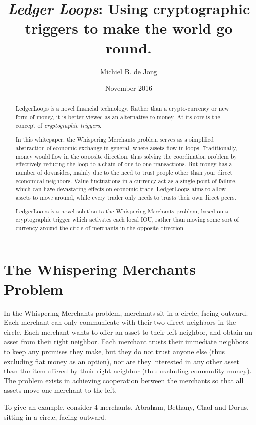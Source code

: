 \documentclass[11pt,twoside,a4paper]{article}
\begin{document}
\title{{\em Ledger Loops}: Using cryptographic triggers to make the world go round.}
\author{Michiel B. de Jong}
\date{November 2016}
\maketitle
\begin{abstract}
LedgerLoops is a novel financial technology. Ra\-ther than a cryp\-to-cur\-ren\-cy or new form of mo\-ney, it is better viewed as an alternative to money. At its core is the concept of {\em cryptographic triggers}.

In this whitepaper, the Whispering Merchants problem serves as a simplified abstraction of economic exchange in general, where assets flow in loops. Traditionally, money would flow in the opposite direction, thus solving the coordination problem by effectively reducing the loop to a chain of one-to-one transactions. But money has a number of downsides, mainly due to the need to trust people other than your direct economical neighbors. Value fluctuations in a currency act as a single point of failure, which can have devastating effects on economic trade. LedgerLoops aims to allow assets to move around, while every trader only needs to trusts their own direct peers.

LedgerLoops is a novel solution to the Whispering Merchants problem, based on a cryptographic trigger which activates each local IOU, ra\-ther than mo\-ving some sort of currency around the circle of merchants in the opposite direction.
\end{abstract}

\section{The Whispering Merchants Problem}
In the Whispering Merchants problem, merchants sit in a circle, facing outward. Each merchant can only communicate with their two direct neighbors in the circle. Each merchant wants to offer an asset to their left neighbor, and obtain an asset from their right neighbor. Each merchant trusts their immediate neighbors to keep any promises they make, but they do not trust anyone else (thus excluding fiat money as an option), nor are they interested in any other asset than the item offered by their right neighbor (thus excluding commodity money). The problem exists in achieving cooperation between the merchants so that all assets move one merchant to the left.

To give an example, consider 4 merchants, Abraham, Bethany, Chad and Dorus, sitting in a circle, facing outward.
\end{document}
